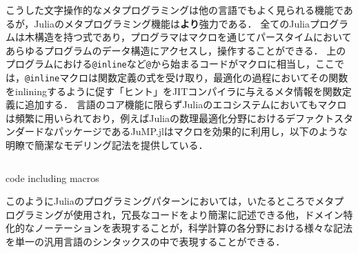 こうした文字操作的なメタプログラミングは他の言語でもよく見られる機能であるが，Juliaのメタプログラミング機能は\textbf{より}強力である．
全てのJuliaプログラムは木構造を持つ式であり，プログラマはマクロを通じてパースタイムにおいてあらゆるプログラムのデータ構造にアクセスし，操作することができる．
上のプログラムにおける\texttt{@inline}など\texttt{@}から始まるコードがマクロに相当し，ここでは，\texttt{@inline}マクロは関数定義の式を受け取り，最適化の過程においてその関数をinliningするように促す「ヒント」をJITコンパイラに与えるメタ情報を関数定義に追加する．
言語のコア機能に限らずJuliaのエコシステムにおいてもマクロは頻繁に用いられており，例えばJuliaの数理最適化分野におけるデファクトスタンダードなパッケージであるJuMP.jl\cite{DunningHuchetteLubin2017}はマクロを効果的に利用し，以下のような明瞭で簡潔なモデリング記法を提供している．

\begin{listing}[ht]
  \inputminted[frame=lines, firstline=4, lastline=10]{julia}{src/jump.jl}
  \caption{code including macros}
  \label{lst:target2}
\end{listing}

このようにJuliaのプログラミングパターンにおいては，いたるところでメタプログラミングが使用され\footnotemark，冗長なコードをより簡潔に記述できる他，ドメイン特化的なノーテーションを表現することが，科学計算の各分野における様々な記法を単一の汎用言語のシンタックスの中で表現することができる\cite{jeff-phd}．


